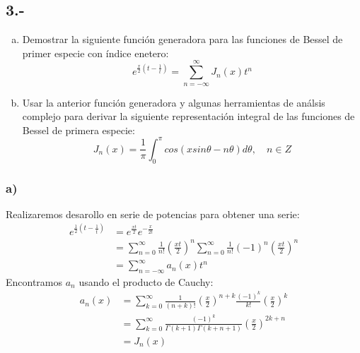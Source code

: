 \documentclass{article}
\begin{document}
\subsection*{3.-}
\begin{enumerate}[a)]
    \item Demostrar la siguiente función generadora para las funciones de Bessel de primer especie con índice enetero:
    \[ e^{\frac{x}{2}(t-\frac{1}{t})} = \sum_{n=-\infty}^\infty J_n(x)t^n \]
    \item Usar la anterior función generadora y algunas herramientas de análsis complejo para derivar la siguiente representación integral 
    de las funciones de Bessel de primera especie:
    \[  J_n(x) = \frac{1}{\pi} \int_0^\pi cos(xsin\theta - n\theta)d\theta, \quad n \in Z \]
\end{enumerate}
\begin{tcolorbox}[breakable]
    \subsubsection*{a)}
    Realizaremos desarollo en serie de potencias para obtener una serie:
    \begin{align*}
        e^{\frac{1}{2}(t-\frac{1}{t})} 
        &= e^{\frac{xt}{2}}e^{-\frac{x}{2t}} \\
        &= \sum_{n=0}^\infty \frac{1}{n!}
        \left( \frac{xt}{2}\right)^n
        \sum_{n=0}^\infty \frac{1}{n!}
        (-1)^n \left(\frac{xt}{2}\right)^n \\
        &= \sum_{n=-\infty}^\infty a_n(x)t^n
    \end{align*}
    Encontramos $a_n$ usando el producto de Cauchy:
    \begin{align*}
        a_n(x) 
        &= \sum_{k=0}^\infty \frac{1}{(n+k)!} 
        \left( \frac{x}{2}\right)^{n+k}
        \frac{(-1)^k}{k!} \left( \frac{x}{2} \right)^k \\
        &= \sum_{k=0}^\infty \frac{(-1)^k}{\Gamma(k+1)\Gamma(k+n+1)} \left(\frac{x}{2}\right)^{2k+n} \\
        &= J_n(x)
    \end{align*}


\end{tcolorbox}
\end{document}
